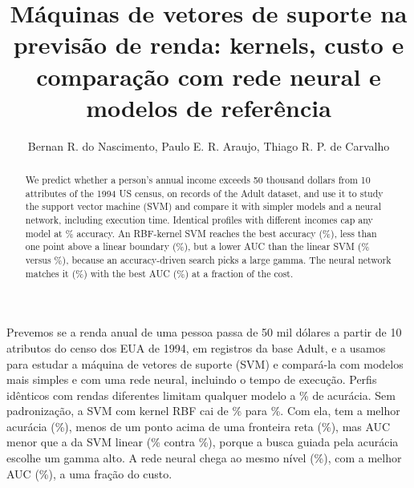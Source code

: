 \documentclass[12pt]{article}
\title{Máquinas de vetores de suporte na previsão de renda: kernels, custo e comparação com rede neural e modelos de referência}
\author{Bernan R. do Nascimento\inst{1}, Paulo E. R. Araujo\inst{1}, Thiago R. P. de Carvalho\inst{1}}
\begin{document}
\maketitle

\begin{abstract}
  We predict whether a person's annual income exceeds 50 thousand dollars from 10 attributes of the
  1994 US census, on \svLinhasEn{} records of the Adult dataset, and use it to study the support vector
  machine (SVM) and compare it with simpler models and a neural network, including execution time.
  Identical profiles with different incomes cap any model at \svTetoEn\% accuracy. An RBF-kernel SVM
  reaches the best accuracy (\svRBFAccEn\%), less than one point above a linear boundary
  (\svLinAccEn\%), but a lower AUC than the linear SVM (\svRBFAucEn\% versus \svLinAucEn\%), because an
  accuracy-driven search picks a large gamma. The neural network matches it (\svRedeAccEn\%) with the
  best AUC (\svRedeAucEn\%) at a fraction of the cost.
\end{abstract}

\begin{resumo}
  Prevemos se a renda anual de uma pessoa passa de 50 mil dólares a partir de 10 atributos do censo dos
  EUA de 1994, em \svLinhas{} registros da base Adult, e a usamos para estudar a máquina de vetores de
  suporte (SVM) e compará-la com modelos mais simples e com uma rede neural, incluindo o tempo de
  execução. Perfis idênticos com rendas diferentes limitam qualquer modelo a \svTeto\% de acurácia. Sem
  padronização, a SVM com kernel RBF cai de \svPadCom\% para \svPadSem\%. Com ela, tem a melhor acurácia
  (\svRBFAcc\%), menos de um ponto acima de uma fronteira reta (\svLinAcc\%), mas AUC menor que a da SVM
  linear (\svRBFAuc\% contra \svLinAuc\%), porque a busca guiada pela acurácia escolhe um gamma alto. A
  rede neural chega ao mesmo nível (\svRedeAcc\%), com a melhor AUC (\svRedeAuc\%), a uma fração do custo.
\end{resumo}












\end{document}

